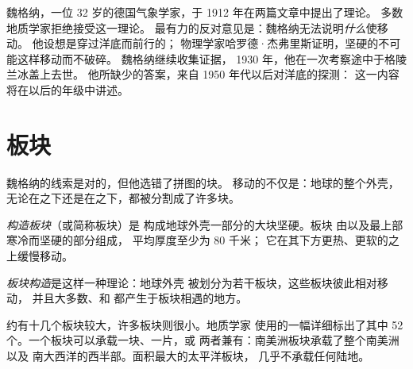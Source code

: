 \begin{history}[魏格纳的设想，1912--1930]
魏格纳，一位 32 岁的德国气象学家，于 1912 年在两篇文章中提出了理论。
多数地质学家拒绝接受这一理论。
最有力的反对意见是：魏格纳无法说明\emph{什么}使移动。
他设想是穿过洋底而前行的；
物理学家哈罗德·杰弗里斯证明，坚硬的不可能这样移动而不破碎。
魏格纳继续收集证据，
1930 年，他在一次考察途中于格陵兰冰盖上去世。
他所缺少的答案，来自 1950 年代以后对洋底的探测：
这一内容将在以后的年级中讲述。
\end{history}

\section{板块}

魏格纳的线索是对的，但他选错了拼图的块。
移动的不仅是：地球的整个外壳，
无论在之下还是在之下，都被分割成了许多块。

\begin{definition}[构造板块]\label{def:g7:plate-tectonics:plate}
\emph{构造板块}（或简称板块）是
构成地球外壳一部分的大块坚硬。板块
由以及最上部寒冷而坚硬的部分组成，
平均厚度至少为 80 千米；
它在其下方更热、更软的之上缓慢移动。
\end{definition}

\begin{definition}[板块构造]\label{def:g7:plate-tectonics:plate-tectonics}
\emph{板块构造}是这样一种理论：地球外壳
被划分为若干板块，这些板块彼此相对移动，
并且大多数、和
都产生于板块相遇的地方。
\end{definition}

\begin{remark}[板块有多少个？]\label{rem:g7:plate-tectonics:how-many}
约有十几个板块较大，许多板块则很小。地质学家
使用的一幅详细标出了其中 52 个。一个板块可以承载一块、一片，或
两者兼有：南美洲板块承载了整个南美洲以及
南大西洋的西半部。面积最大的太平洋板块，
几乎不承载任何陆地。
\end{remark}

